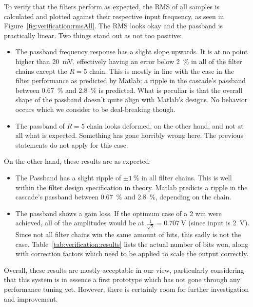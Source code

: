 To verify  that the  filters perform as  expected, the RMS  of all  samples is
calculated and  plotted against their  respective input frequency, as  seen in
Figure~\ref{fig:verification:rmsAll}.  The RMS looks  okay and the passband is
practically linear. Two things stand out as not too positive:
\begin{itemize}\tightlist
    \item 
        The passband frequency  response has a slight slope  upwards. It is at
        no  point  higher  than  \SI{20}{\mV},  effectively  having  an  error
        below  \SI{2}{\percent}  in  all  of  the  filter  chains  except  the
        $R=5$  chain.  
        This is  mostly in  line with  the case in  the filter  performance as
        predicted  by  Matlab; a  ripple  in  the cascade's  passband  between
        \SI{0.67}{\percent} and \SI{2.8}{\percent} is predicted.
        What is  peculiar is that  the overall  shape of the  passband doesn't
        quite  align  with  Matlab's  designs. No  behavior  occurs  which  we
        consider to be deal-breaking though.
    \item 
        The passband of $R=5$ chain looks deformed, on the other hand, and not
        at all what  is expected. Something has gone  horribly wrong here. The
        previous statements do not apply for this case.
\end{itemize}
On the other hand, these results are as expected:
\begin{itemize}
    \item 
        The  Passband has  a  slight ripple  of  $\pm\SI{1}{\percent}$ in  all
        filter chains.  This is well within the filter design specification in
        theory.  Matlab predicts a  ripple in the cascade's passband between
        \SI{0.67}{\percent} and \SI{2.8}{\percent}, depending on the chain.
    \item 
        The  passband   shows  a   gain  loss. If  the   optimum  case   of  a
        \SI{2}{\bit}  win   were  achieved,   all  of  the   amplitudes  would
        be   at  $\frac{1}{\sqrt{2}}   =  \SI{0.707}{\V}$   (since  input   is
        \SI{2}{V_{}}).    Since   not   all   filter   chains   win
        the   same   amount  of   bits,   this   sadly   is  not   the   case.
        Table~\ref{tab:verification:results} lists  the actual number  of bits
        won, along with  correction factors which need to be  applied to scale
        the output correctly.
\end{itemize}
Overall,  these  results  are  mostly acceptable  in  our  view,  particularly
considering that  this system is  in essence a  first prototype which  has not
gone through any performance tuning  yet. However, there is certainly room for
further investigation and improvement.

